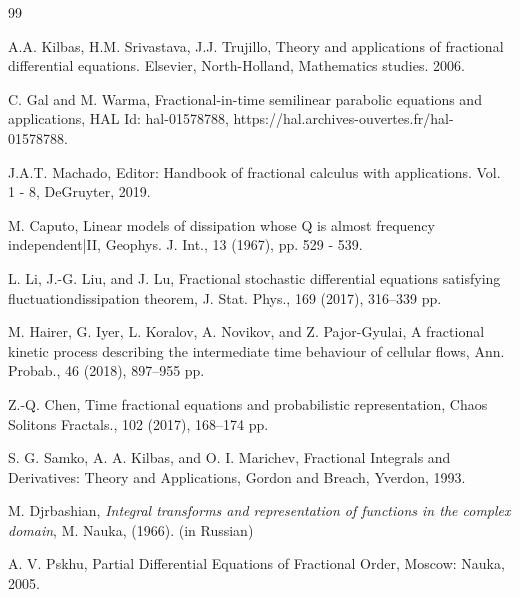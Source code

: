 \documentclass[12pt]{amsart}
\theoremstyle{definition}
\numberwithin{equation}{section}
\begin{document}

 \begin{thebibliography}{99}
 \normalsize

%



 A.A. Kilbas, H.M. Srivastava, J.J. Trujillo,   Theory and applications of fractional differential equations. Elsevier, North-Holland, Mathematics studies. 2006.


 C. Gal and M. Warma, Fractional-in-time semilinear parabolic equations and applications, HAL
Id: hal-01578788, https://hal.archives-ouvertes.fr/hal-01578788.

J.A.T. Machado, Editor: Handbook of fractional calculus with applications. Vol. 1 - 8, DeGruyter, 2019.


 M. Caputo, Linear models of dissipation whose Q is almost frequency independent|II, Geophys. J. Int., 13 (1967), pp. 529 - 539.

L. Li, J.-G. Liu, and J. Lu, Fractional stochastic differential equations satisfying fluctuationdissipation theorem, J. Stat. Phys., 169 (2017),  316--339 pp.

 M. Hairer, G. Iyer, L. Koralov, A. Novikov, and Z. Pajor-Gyulai, A fractional kinetic
process describing the intermediate time behaviour of cellular flows, Ann. Probab., 46
(2018),  897--955 pp.

 Z.-Q. Chen, Time fractional equations and probabilistic representation, Chaos Solitons Fractals., 102 (2017), 168--174 pp.





 S. G. Samko, A. A. Kilbas, and O. I. Marichev, Fractional Integrals and Derivatives: Theory
and Applications, Gordon and Breach, Yverdon, 1993.














 M. Djrbashian, \textit{Integral transforms and representation of functions in the complex domain}, M. Nauka, (1966). (in Russian)


 A. V. Pskhu, Partial Differential Equations of Fractional Order, Moscow: Nauka, 2005.








\end{thebibliography}
\end{document}
